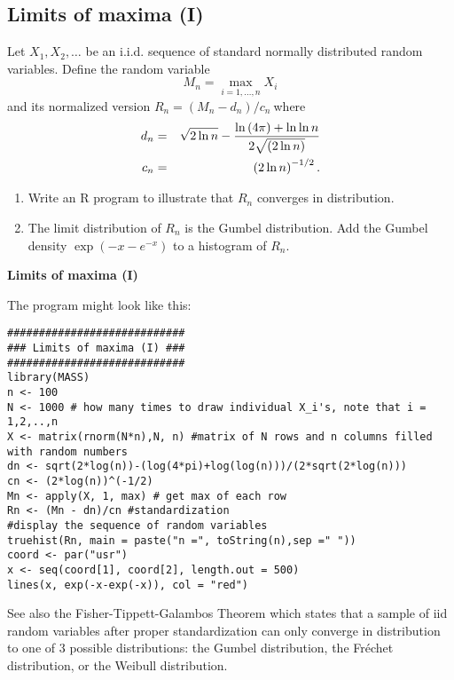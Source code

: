 \documentclass{article}
\begin{document}
\subsection{Limits of maxima (I)}

Let $X_{1},X_{2},\ldots $ be an i.i.d. sequence of standard normally
distributed random variables. Define the random variable%
\begin{equation*}
M_{n}=\max_{i=1,\ldots ,n}X_{i}
\end{equation*}%
and its normalized version $R_{n}=(M_{n}-d_{n})/c_{n}\ $where
\begin{eqnarray*}
d_{n} &=&\sqrt{2\ln n}-\frac{\ln \left( 4\pi \right) +\ln \ln n}{2\sqrt{%
\left( 2\ln n\right) }} \\
c_{n} &=&\left( 2\ln n\right) ^{-1/2}.
\end{eqnarray*}

\begin{enumerate}
\item Write an R program to illustrate that $R_{n}$ converges in
distribution.

\item The limit distribution of $R_{n}$ is the Gumbel distribution. Add the
Gumbel density $\exp \left( -x-e^{-x}\right) $ to a histogram of $R_{n}$.
\end{enumerate}

\begin{solution}
\textbf{Limits of maxima (I)}

The program might look like this:
\begin{verbatim}
############################
### Limits of maxima (I) ###
############################
library(MASS)
n <- 100
N <- 1000 # how many times to draw individual X_i's, note that i = 1,2,..,n
X <- matrix(rnorm(N*n),N, n) #matrix of N rows and n columns filled with random numbers
dn <- sqrt(2*log(n))-(log(4*pi)+log(log(n)))/(2*sqrt(2*log(n)))
cn <- (2*log(n))^(-1/2)
Mn <- apply(X, 1, max) # get max of each row
Rn <- (Mn - dn)/cn #standardization
#display the sequence of random variables
truehist(Rn, main = paste("n =", toString(n),sep =" "))
coord <- par("usr")
x <- seq(coord[1], coord[2], length.out = 500)
lines(x, exp(-x-exp(-x)), col = "red")
\end{verbatim}
See also the Fisher-Tippett-Galambos Theorem which states that a sample of iid random variables after proper standardization can only converge in distribution to one of 3 possible distributions: the Gumbel distribution, the Fréchet distribution, or the Weibull distribution.
\end{solution}
\end{document}
